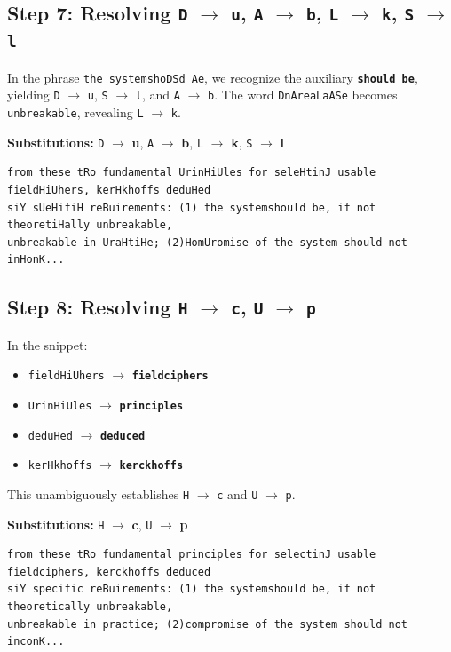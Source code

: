 \documentclass[12pt,a4paper]{article}
\begin{document}
\subsection{Step 7: Resolving \texorpdfstring{\texttt{D} $\to$ \texttt{u}, \texttt{A} $\to$ \texttt{b}, \texttt{L} $\to$ \texttt{k}, \texttt{S} $\to$ \texttt{l}}{D -> u, A -> b, L -> k, S -> l}}
In the phrase \texttt{the systemshoDSd Ae}, we recognize the auxiliary \textbf{\texttt{should be}}, yielding \texttt{D} $\to$ \texttt{u}, \texttt{S} $\to$ \texttt{l}, and \texttt{A} $\to$ \texttt{b}.
The word \texttt{DnAreaLaASe} becomes \texttt{unbreakable}, revealing \texttt{L} $\to$ \texttt{k}.
\begin{center}
    \textbf{Substitutions:} \texttt{D} $\to$ \textbf{u}, \texttt{A} $\to$ \textbf{b}, \texttt{L} $\to$ \textbf{k}, \texttt{S} $\to$ \textbf{l}
\end{center}

\begin{lstlisting}[caption={Text snippet after Step 7}]
from these tRo fundamental UrinHiUles for seleHtinJ usable fieldHiUhers, kerHkhoffs deduHed 
siY sUeHifiH reBuirements: (1) the systemshould be, if not theoretiHally unbreakable, 
unbreakable in UraHtiHe; (2)HomUromise of the system should not inHonK...
\end{lstlisting}

\subsection{Step 8: Resolving \texorpdfstring{\texttt{H} $\to$ \texttt{c}, \texttt{U} $\to$ \texttt{p}}{H -> c, U -> p}}
In the snippet:
\begin{itemize}
    \item \texttt{fieldHiUhers} $\to$ \textbf{\texttt{fieldciphers}}
    \item \texttt{UrinHiUles} $\to$ \textbf{\texttt{principles}}
    \item \texttt{deduHed} $\to$ \textbf{\texttt{deduced}}
    \item \texttt{kerHkhoffs} $\to$ \textbf{\texttt{kerckhoffs}}
\end{itemize}
This unambiguously establishes \texttt{H} $\to$ \texttt{c} and \texttt{U} $\to$ \texttt{p}.
\begin{center}
    \textbf{Substitutions:} \texttt{H} $\to$ \textbf{c}, \texttt{U} $\to$ \textbf{p}
\end{center}

\begin{lstlisting}[caption={Text snippet after Step 8}]
from these tRo fundamental principles for selectinJ usable fieldciphers, kerckhoffs deduced 
siY specific reBuirements: (1) the systemshould be, if not theoretically unbreakable, 
unbreakable in practice; (2)compromise of the system should not inconK...
\end{lstlisting}
\end{document}

